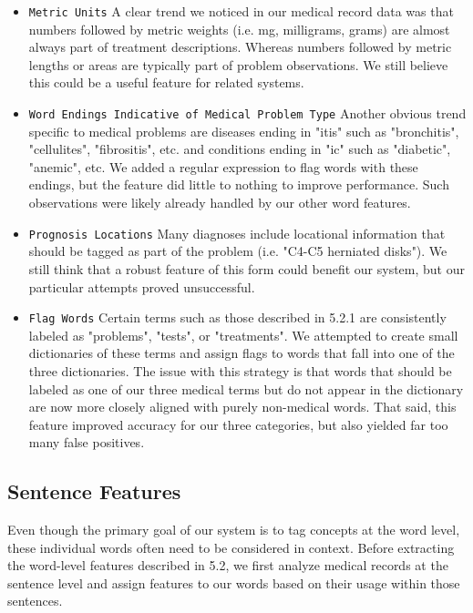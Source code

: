 \documentclass[preprint]{style}
\begin{document}
\begin{itemize}

\item {\tt Metric Units}
A clear trend we noticed in our medical record data was that numbers followed by metric weights (i.e. mg, milligrams, grams) are almost always part of treatment descriptions. Whereas numbers followed by metric lengths or areas are typically part of problem observations. We still believe this could be a useful feature for related systems.
 
\item {\tt Word Endings Indicative of Medical Problem Type}
Another obvious trend specific to medical problems are diseases ending in "itis" such as "bronchitis", "cellulites", "fibrositis", etc. and conditions ending in "ic" such as "diabetic", "anemic", etc. We added a regular expression to flag words with these endings, but the feature did little to nothing to improve performance. Such observations were likely already handled by our other word features.

\item {\tt Prognosis Locations}
Many diagnoses include locational information that should be tagged as part of the problem (i.e. "C4-C5 herniated disks"). We still think that a robust feature of this form could benefit our system, but our particular attempts proved unsuccessful.  

\item {\tt Flag Words}
Certain terms such as those described in 5.2.1 are consistently labeled as "problems", "tests", or "treatments". We attempted to create small dictionaries of these terms and assign flags to words that fall into one of the three dictionaries. The issue with this strategy is that words that should be labeled as one of our three medical terms but do not appear in the dictionary are now more closely aligned with purely non-medical words. That said, this feature improved accuracy for our three categories, but also yielded far too many false positives.

\end{itemize}

\subsection{Sentence Features}
Even though the primary goal of our system is to tag concepts at the word level, these individual words often need to be considered in context. Before extracting the word-level features described in 5.2, we first analyze medical records at the sentence level and assign features to our words based on their usage within those sentences.
\end{document}

